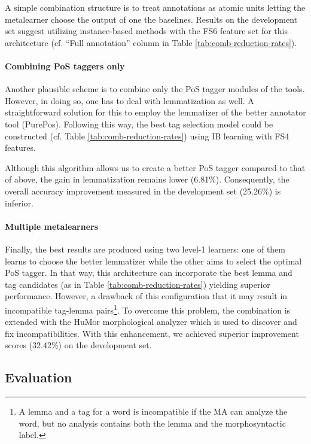 A simple combination structure is to treat annotations as atomic units letting the metalearner choose the output of one the baselines.
Results on the development set suggest utilizing instance-based methods with the FS6 feature set for this architecture (cf. ``Full annotation'' column in Table \ref{tab:comb-reduction-rates}). 

\paragraph{Combining PoS taggers only} %

Another plausible scheme is to combine only the PoS tagger modules of the tools.
However, in doing so, one has to deal with lemmatization as well.
A straightforward solution for this to employ the lemmatizer of the better annotator tool (PurePos).
Following this way, the best tag selection model could be constructed (cf.
Table \ref{tab:comb-reduction-rates}) using IB learning with FS4 features.

Although this algorithm allows us to create a better PoS tagger compared to that of above, the gain in lemmatization remains lower (6.81\%).
Consequently, the overall accuracy improvement measured in the development set (25.26\%) is inferior.

\paragraph{Multiple metalearners}

Finally, the best results are produced using two level-1 learners: one of them learns to choose the better lemmatizer while the other aims to select the optimal PoS tagger.
In that  way, this architecture can incorporate the best lemma and tag candidates (as in Table \ref{tab:comb-reduction-rates}) yielding superior performance.
However, a drawback of this configuration that it may result in incompatible tag-lemma pairs\footnote{ A lemma and a tag for a word is incompatible if the MA can analyze the word, but no analysis contains both the lemma and the morphosyntactic label.}.
To overcome this problem, the combination is extended with the HuMor morphological analyzer which is used to discover and fix incompatibilities.
With this enhancement, we achieved superior improvement scores (32.42\%) on the development set.


\subsection{Evaluation}


